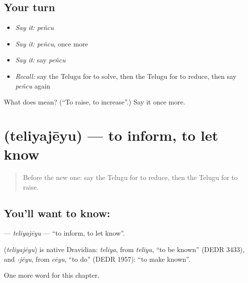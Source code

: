 \subsection*{Your turn}
\begin{itemize}
\raggedright
  \item \emph{Say it:} \emph{peñcu}
  \item \emph{Say it:} \emph{peñcu}, once more
  \item \emph{Say it:} say \emph{peñcu}
  \item \emph{Recall:} say the Telugu for to solve, then the Telugu for to reduce, then say \emph{peñcu} again
\end{itemize}

\begin{tcolorbox}[breakable,colback=teal!4,colframe=teal!35!black,title={Before you move on}]
What does  mean? (\textquotedblleft{}To raise, to increase\textquotedblright{}.) Say it once more.
\end{tcolorbox}
\section[\texorpdfstring{\te{తెలియజేయు} (teliyajēyu)}{తెలియజేయు (teliyajēyu)}]{ (teliyajēyu) — to inform, to let know}

\label{lesson:TE-C243-teliyajeyu}



\begin{quote}
Before the new one: say the Telugu for to reduce, then the Telugu for to raise.
\end{quote}

\subsection*{You'll want to know: }
\textbf{} — \emph{teliyajēyu} — \textquotedblleft{}to inform, to let know\textquotedblright{}.

\begin{cousinweb}
\textbf{} (\emph{teliyajēyu}) is native Dravidian: \emph{teliya}, from \emph{teliyu}, \textquotedblleft{}to be known\textquotedblright{} (DEDR 3433), and \emph{-jēyu}, from \emph{cēyu}, \textquotedblleft{}to do\textquotedblright{} (DEDR 1957): \textquotedblleft{}to make known\textquotedblright{}.
\end{cousinweb}

\begin{grammarlens}[title={What you've built}]
One more word for this chapter.
\end{grammarlens}

